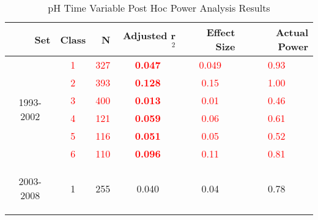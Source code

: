 \begin{table}\tiny
  \centering
  \caption{pH Time Variable Post Hoc Power Analysis Results}
    \begin{tabular}{rrrrrr}
    \toprule
    Set   & Class & N     & Adjusted r$^2$ & \multicolumn{1}{p{.5cm}}{Effect Size} & Actual Power \\
    \midrule
    \multicolumn{1}{c}{\multirow{6}[1]{*}{\begin{sideways}1993-2002\end{sideways}}} & \multicolumn{1}{c}{\textcolor{red}{1}} & \multicolumn{1}{c}{\textcolor{red}{327}} & \multicolumn{1}{c}{\textcolor{red}{\textbf{0.047}}} & \multicolumn{1}{c}{\textcolor{red}{0.049}} & \multicolumn{1}{c}{\textcolor{red}{0.93}} \\
    \multicolumn{1}{c}{} & \multicolumn{1}{c}{\textcolor{red}{2}} & \multicolumn{1}{c}{\textcolor{red}{393}} & \multicolumn{1}{c}{\textcolor{red}{\textbf{0.128}}} & \multicolumn{1}{c}{\textcolor{red}{0.15}} & \multicolumn{1}{c}{\textcolor{red}{1.00}} \\
    \multicolumn{1}{c}{} & \multicolumn{1}{c}{\textcolor{red}{3}} & \multicolumn{1}{c}{\textcolor{red}{400}} & \multicolumn{1}{c}{\textcolor{red}{\textbf{0.013}}} & \multicolumn{1}{c}{\textcolor{red}{0.01}} & \multicolumn{1}{c}{\textcolor{red}{0.46}} \\
    \multicolumn{1}{c}{} & \multicolumn{1}{c}{\textcolor{red}{4}} & \multicolumn{1}{c}{\textcolor{red}{121}} & \multicolumn{1}{c}{\textcolor{red}{\textbf{0.059}}} & \multicolumn{1}{c}{\textcolor{red}{0.06}} & \multicolumn{1}{c}{\textcolor{red}{0.61}} \\
    \multicolumn{1}{c}{} & \multicolumn{1}{c}{\textcolor{red}{5}} & \multicolumn{1}{c}{\textcolor{red}{116}} & \multicolumn{1}{c}{\textcolor{red}{\textbf{0.051}}} & \multicolumn{1}{c}{\textcolor{red}{0.05}} & \multicolumn{1}{c}{\textcolor{red}{0.52}} \\
    \multicolumn{1}{c}{} & \multicolumn{1}{c}{\textcolor{red}{6}} & \multicolumn{1}{c}{\textcolor{red}{110}} & \multicolumn{1}{c}{\textcolor{red}{\textbf{0.096}}} & \multicolumn{1}{c}{\textcolor{red}{0.11}} & \multicolumn{1}{c}{\textcolor{red}{0.81}} \\\midrule
    \multicolumn{1}{c}{\multirow{6}[2]{*}{\begin{sideways}2003-2008\end{sideways}}} & \multicolumn{1}{c}{1} & \multicolumn{1}{c}{255} & \multicolumn{1}{c}{0.040 } & \multicolumn{1}{c}{0.04 } & \multicolumn{1}{c}{0.78 } \\

\end{tabular}
\end{table}
